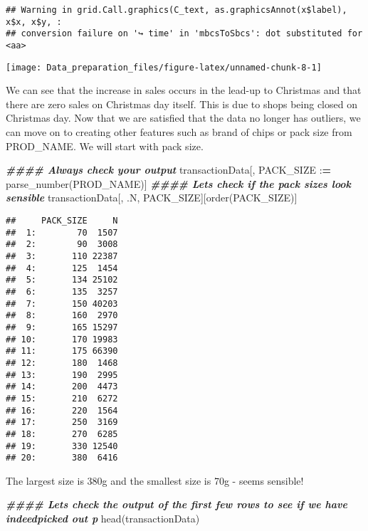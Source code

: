 \documentclass[
]{article}
\newenvironment{Shaded}{\begin{snugshade}}{\end{snugshade}}
\newcommand{\DocumentationTok}[1]{\textcolor[rgb]{0.56,0.35,0.01}{\textbf{\textit{#1}}}}
\newcommand{\ErrorTok}[1]{\textcolor[rgb]{0.64,0.00,0.00}{\textbf{#1}}}
\newcommand{\FunctionTok}[1]{\textcolor[rgb]{0.00,0.00,0.00}{#1}}
\newcommand{\NormalTok}[1]{#1}
\newcommand{\SpecialCharTok}[1]{\textcolor[rgb]{0.00,0.00,0.00}{#1}}
\begin{document}
\begin{verbatim}
## Warning in grid.Call.graphics(C_text, as.graphicsAnnot(x$label), x$x, x$y, :
## conversion failure on '↪ time' in 'mbcsToSbcs': dot substituted for <aa>
\end{verbatim}

\begin{center}\texttt{[image: Data\_preparation\_files/figure-latex/unnamed-chunk-8-1]} \end{center}

We can see that the increase in sales occurs in the lead-up to Christmas
and that there are zero sales on Christmas day itself. This is due to
shops being closed on Christmas day. Now that we are satisfied that the
data no longer has outliers, we can move on to creating other features
such as brand of chips or pack size from PROD\_NAME. We will start with
pack size.

\begin{Shaded}
\begin{Highlighting}[]
\DocumentationTok{\#\#\#\# Always check your output}
\NormalTok{transactionData[, PACK\_SIZE }\SpecialCharTok{:}\ErrorTok{=} \FunctionTok{parse\_number}\NormalTok{(PROD\_NAME)]}
\DocumentationTok{\#\#\#\# Let\textquotesingle{}s check if the pack sizes look sensible}
\NormalTok{transactionData[, .N, PACK\_SIZE][}\FunctionTok{order}\NormalTok{(PACK\_SIZE)]}
\end{Highlighting}
\end{Shaded}

\begin{verbatim}
##     PACK_SIZE     N
##  1:        70  1507
##  2:        90  3008
##  3:       110 22387
##  4:       125  1454
##  5:       134 25102
##  6:       135  3257
##  7:       150 40203
##  8:       160  2970
##  9:       165 15297
## 10:       170 19983
## 11:       175 66390
## 12:       180  1468
## 13:       190  2995
## 14:       200  4473
## 15:       210  6272
## 16:       220  1564
## 17:       250  3169
## 18:       270  6285
## 19:       330 12540
## 20:       380  6416
\end{verbatim}

The largest size is 380g and the smallest size is 70g - seems sensible!

\begin{Shaded}
\begin{Highlighting}[]
\DocumentationTok{\#\#\#\# Let\textquotesingle{}s check the output of the first few rows to see if we have indeedpicked out p}
\FunctionTok{head}\NormalTok{(transactionData)}
\end{Highlighting}
\end{Shaded}
\end{document}
